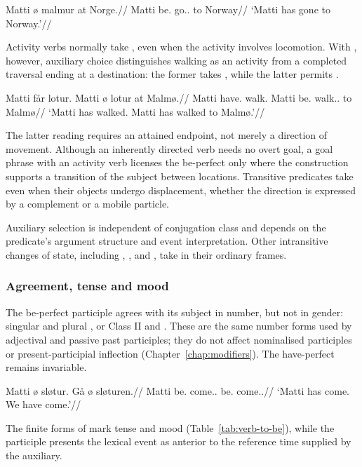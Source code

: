 \pex
\begingl
\gla Matti ø malmur at Norge.//
\glb Matti be.\Pres{} go.\PstP{}.\Sg{} to Norway//
\glft `Matti has gone to Norway.'//
\endgl
\xe

Activity verbs normally take , even when the activity involves locomotion. With , however, auxiliary choice distinguishes walking as an activity from a completed traversal ending at a destination: the former takes , while the latter permits .

\pex
\begingl
\gla Matti får lotur. Matti ø lotur at Malmø.//
\glb Matti have.\Pres{} walk.\PstP{} Matti be.\Pres{} walk.\PstP{}.\Sg{} to Malmø//
\glft `Matti has walked. Matti has walked to Malmø.'//
\endgl
\xe

The latter reading requires an attained endpoint, not merely a direction of movement. Although an inherently directed verb needs no overt goal, a goal phrase with an activity verb licenses the be-perfect only where the construction supports a transition of the subject between locations. Transitive predicates take  even when their objects undergo displacement, whether the direction is expressed by a complement or a mobile particle.

Auxiliary selection is independent of conjugation class and depends on the predicate's argument structure and event interpretation. Other intransitive changes of state, including , , and , take  in their ordinary frames.

\subsubsection{Agreement, tense and mood}

The be-perfect participle agrees with its subject in number, but not in gender: singular  and plural , or Class II  and . These are the same number forms used by adjectival and passive past participles; they do not affect nominalised participles or present-participial inflection (Chapter~\ref{chap:modifiers}). The have-perfect remains invariable.

\pex
\begingl
\gla Matti ø sløtur. Gå ø sløturen.//
\glb Matti be.\Pres{} come.\PstP{}.\Sg{} \First{}\Pl{} be.\Pres{} come.\PstP{}.\Pl{}//
\glft `Matti has come. We have come.'//
\endgl
\xe

The finite forms of  mark tense and mood (Table~\ref{tab:verb-to-be}), while the participle presents the lexical event as anterior to the reference time supplied by the auxiliary.

